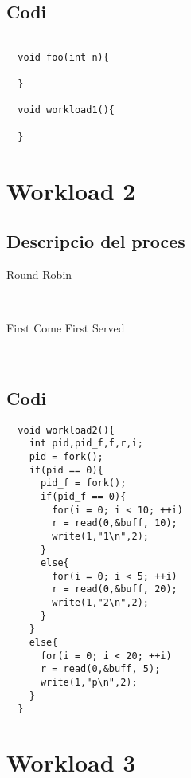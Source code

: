 \documentclass{article}
\begin{document}
\subsection{Codi}
\begin{lstlisting}

  void foo(int n){
    
  }

  void workload1(){
   
  }

\end{lstlisting}


\section{Workload 2}
\subsection{Descripcio del  proces}
\begin{description}
  \item [Round Robin] \hfill \\
  \item  [First Come First Served] \hfill \\

  \end{description}
\subsection{Codi}
\begin{lstlisting}
  void workload2(){
    int pid,pid_f,f,r,i;
    pid = fork();
    if(pid == 0){
      pid_f = fork();
      if(pid_f == 0){
        for(i = 0; i < 10; ++i)
        r = read(0,&buff, 10);
        write(1,"1\n",2);
      }
      else{
        for(i = 0; i < 5; ++i)
        r = read(0,&buff, 20);
        write(1,"2\n",2);
      }
    }
    else{
      for(i = 0; i < 20; ++i)
      r = read(0,&buff, 5);
      write(1,"p\n",2);
    }
  }
\end{lstlisting}

\section{Workload 3}
\end{document}
